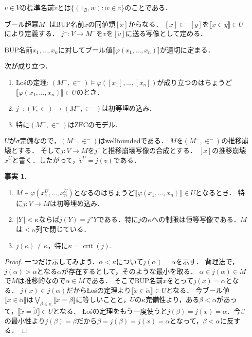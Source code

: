 \documentclass[uplatex,dvipdfmx]{jsarticle}
\newcommand{\ZFC}{\mathrm{ZFC}}
\newcommand{\crit}{\operatorname{crit}}
\DeclarePairedDelimiter\abs{\lvert}{\rvert}
\newcommand{\truth}[1]{\llbracket #1 \rrbracket}
\theoremstyle{definition}
\newtheorem{fact}[thm]{事実}
\begin{document}
	$v \in V$の標準名前$\check{v}$とは$\{ (1_B, w) : w \in v \}$のことである．
	
	ブール超冪$M^-$はBUP名前$x$の同値類$[x]$からなる．
	$[x] \in^- [y]$を$\truth{x \in y} \in U$により定義する．
	$j^- \colon V \to M^-$を$v$を$[\check{v}]$に送る写像として定める．
	
	BUP名前$x_1, \dots, x_n$に対してブール値$\truth{\varphi(x_1, \dots, x_n)}$が適切に定まる．

	次が成り立つ．
	\begin{enumerate}
		\item Łośの定理: $(M^-, \in^-) \models \varphi([x_1], \dots, [x_n])$が成り立つのはちょうど$\truth{\varphi(x_1, \dots, x_n)} \in U$のとき．
		\item $j^- \colon (V, \in) \to (M^-, \in^-)$は初等埋め込み．
		\item 特に$(M^-, \in^-)$は$\ZFC$のモデル．
	\end{enumerate}
	
	$U$が$\sigma$完備なので，$(M^-, \in^-)$はwellfoundedである．
	$M$を$(M^-, \in^-)$の推移崩壊とする．
	そして$j \colon V \to M$を$j^-$と推移崩壊写像の合成とする．
	$[x]$の推移崩壊$x^U$と書く．したがって，$\check{v}^U = j(v)$である．

	\begin{fact}
	\begin{enumerate}
		\item $M \models \varphi(x_1^U, \dots, x_n^U)$となるのはちょうど$\truth{\varphi(x_1, \dots, x_n)} \in U$となるとき．
		特に$j \colon V \to M$は初等埋め込み．
		\item $\abs{Y} < \kappa$ならば$j(Y) = j''Y$である．特に$j$の$\kappa$への制限は恒等写像である．$M$は${<}\kappa$列で閉じている．
		\item $j(\kappa) \ne \kappa$，特に$\kappa = \crit(j)$.
	\end{enumerate}
	\end{fact}
	\begin{proof}
		一つだけ示してみよう．$\alpha < \kappa$について$j(\alpha) = \alpha$を示す．
		背理法で，$j(\alpha) > \alpha$となる$\alpha$が存在するとして，そのような最小を取る．
		$\alpha \in j(\alpha) \in M$で$M$は推移的なので$\alpha \in M$である．
		そこでBUP名前$x$をとって$j(x) = \alpha$となる．
		$j(x) \in j(\alpha)$だからŁośの定理より$\truth{\check{x} \in \check{\alpha}} \in U$となる．
		今ブール値$\truth{\check{x} \in \check{\alpha}}$は$\bigvee_{\beta \in \alpha} \truth{\check{x} = \check{\beta}}$に等しいことと，$U$の$\kappa$完備性より，ある$\beta < \alpha$があって，$\truth{\check{x} = \check{\beta}} \in U$となる．
		Łośの定理をもう一度使うと$j(\beta) = j(x) = \alpha$．今$\beta$の最小性より$j(\beta) = \beta$だから$\beta = j(\beta) = j(x) = \alpha$となって，$\beta < \alpha$に反する．
	\end{proof}
\end{document}
